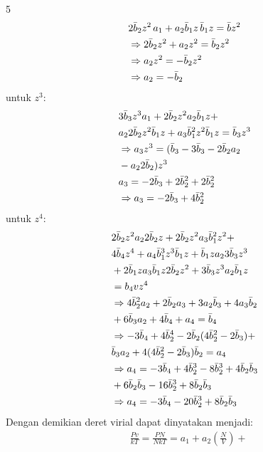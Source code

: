 \documentclass[a4paper  , 6 pt]{article}
\begin{document}
\begin{tiny}
\begin{multicols} {5}
\begin{align}
& 2 \bar{b}_2 z^2 \, a_1 + a_2 \bar{b}_1 z \, \bar{b}_1 z  = \bar{b} z^2 \nonumber \\
& \Rightarrow 2 \bar{b}_2 z^2 + a_2 z^2 = \bar{b}_2 z^2 \nonumber \\
& \Rightarrow a_2 z^2  = - \bar{b}_2 z^2  \nonumber \\
& \Rightarrow a_2 = - \bar{b}_2 
\end{align}
untuk $z^3$:
\begin{align}
& 3 \bar{b}_3 z^3 a_1 + 2 \bar{b}_2 z^2 a_2 \bar{b}_1 z + \nonumber \\
&  a_2 2 \bar{b}_2 z^2 \bar{b}_1 z + a_3 \bar{b}_1^2 z^2 \bar{b}_1 z = \bar{b}_3 z^3  \nonumber \\
& \Rightarrow a_3 z^3 = (\bar{b}_3 - 3 \bar{b}_3 - 2 \bar{b}_2 a_2 \nonumber \\
&  - a_2 2 \bar{b}_2)z^3  \nonumber \\
& a_3 = - 2 \bar{b}_3 + 2 \bar{b}_2^2 + 2 \bar{b}_2^2 \nonumber \\
& \Rightarrow a_3 = - 2 \bar{b}_3 + 4 \bar{b}_2^2
\end{align}
untuk $z^4$:
\begin{align}
& 2 \bar{b}_2 z^2 a_2 2 \bar{b}_2 z + 2 \bar{b}_2 z^2 a_3 \bar{b}_1^2 z^2 +  \nonumber \\
& 4 \bar{b}_4 z^4 + a_4 \bar{b}_1^3 z^3 \bar{b}_1 z  + \bar{b}_1 z a_2 3 \bar{b}_3 z^3 \nonumber \\
& + 2 \bar{b}_1 z  a_3 \bar{b}_1 z 2 \bar{b}_2 z^2  + 3 \bar{b}_3 z^3 a_2 \bar{b}_1 z  \nonumber \\
&  = b_4v z^4 \nonumber \\
&\Rightarrow 4 \bar{b}_2^2 a_2 + 2 \bar{b}_2 a_3 + 3 a_2 \bar{b}_3 + 4 a_3 \bar{b}_2  \nonumber \\
& + 6 \bar{b}_3 a_2 + 4 \bar{b}_4 + a_4 = \bar{b}_4 \nonumber \\
& \Rightarrow - 3\bar{b}_4 + 4\bar{b}_2^4  - 2 \bar{b}_2 (4 \bar{b}_2^2 - 2 \bar{b}_3) + \nonumber \\
&  \bar{b}_3 a_2 + 4(4 \bar{b}_2^2 - 2 \bar{b}_3)\bar{b}_2  = a_4\nonumber \\
& \Rightarrow a_4 = -3 \bar{b}_4 + 4 \bar{b}_2^3 - 8 \bar{b}_2^3 + 4 \bar{b}_2 \bar{b}_3 \nonumber \\
&  + 6 \bar{b}_2 \bar{b}_3 - 16 \bar{b}_2^3 + 8 \bar{b}_2 \bar{b}_3 \nonumber \\
& \Rightarrow a_4 = - 3\bar{b}_4 - 20 \bar{b}_2^3 + 8\bar{b}_2 \bar{b}_3
\end{align}
Dengan demikian deret virial dapat dinyatakan menjadi:
\begin{align}
& \frac{Pv}{kT}  =  \frac{PN}{NkT} = a_1 +  
 a_2 \left( \frac{N}{V}\right) + \nonumber \\

\end{align}
\end{multicols}
\end{tiny}
\end{document}
